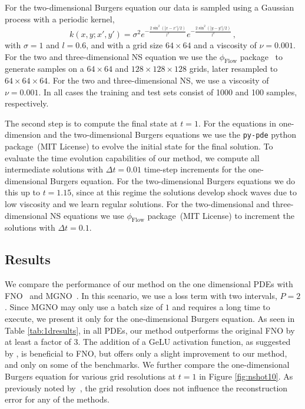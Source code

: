 \documentclass{article}
\theoremstyle{plain}
\theoremstyle{definition}
\theoremstyle{remark}
\begin{document}
For the two-dimensional Burgers equation our data is sampled using a Gaussian process with a periodic kernel,
\begin{equation}
    k(x,y;x',y') = \sigma^2 e^{-\frac{2\sin^2(|x-x'|/2)}{l^2}} e^{-\frac{2\sin^2(|y-y'|/2)}{l^2}}\,,
\end{equation} 
with $\sigma=1$ and $l=0.6$, and with a grid size $64\times 64$ and a viscosity of $\nu=0.001$.
For the two and three-dimensional NS equation we use the $\phi_{\text{Flow}}$ package~\citep{holl2020phiflow} to generate samples on a $64\times64$ and $128\times128\times128$ grids, later resampled to $64\times64\times64$. For the two and three-dimensional NS, we use a viscosity of $\nu=0.001$.
In all cases the training and test sets consist of 1000 and 100 samples, respectively.


The second step is to compute the final state at $t=1$. For the equations in one-dimension and the two-dimensional Burgers equations we use the \texttt{py-pde} python package~\citep{Zwicker2020}(MIT License) to evolve the initial state for the final solution.
To evaluate the time evolution capabilities of our method, we compute all intermediate solutions with $\Delta t = 0.01$ time-step increments for the one-dimensional Burgers equation. For the two-dimensional Burgers equations we do this up to $t=1.15$, since at this regime the solutions develop shock waves due to low viscosity and we learn regular solutions. For the two-dimensional and three-dimensional NS equations we use $\phi_{\text{Flow}}$ package~\citep{holl2020phiflow}(MIT License) to increment the solutions with $\Delta t=0.1$.




\subsection{Results}

We compare the performance of our method on the one dimensional PDEs with FNO~\citep{li2020fourier} and MGNO~\citep{li2020multipole}. In this scenario, we use a loss term with two intervals, $P=2$. Since MGNO may only use a batch size of $1$ and requires a long time to execute, we present it only for the one-dimensional Burgers equation. As seen in Table \ref{tab:1dresults}, in all PDEs, our method outperforms the original FNO by at least a factor of 3. The addition of a GeLU activation function, as suggested by \citet{DBLP:journals/corr/abs-2108-08481}, is beneficial to FNO, but offers only a slight improvement to our method, and only on some of the benchmarks. 
We further compare the one-dimensional Burgers equation for various grid resolutions at $t=1$ in Figure \ref{fig:nshot10}. As previously noted by~\citet{li2020fourier}, the grid resolution does not influence the reconstruction error for any of the methods.
\end{document}
